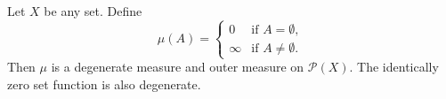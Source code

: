 Let $X$ be any set. Define
$$\mu(A) = \begin{cases} 0 & \text{if } A = \emptyset, \\ \infty & \text{if } A \neq \emptyset. \end{cases}$$
Then $\mu$ is a degenerate measure and outer measure on $\mathcal{P}(X)$. The identically zero set function is also degenerate.